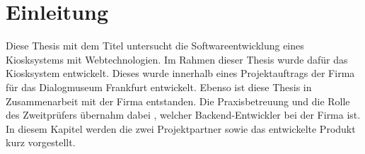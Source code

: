 \chapter{Einleitung}
\label{chap:einleitung}

Diese Thesis mit dem Titel \emph{\getTitle{}} untersucht die Softwareentwicklung eines 
Kiosksystems mit Webtechnologien. Im Rahmen dieser Thesis wurde dafür das Kiosksystem
\emph{\shst{}} entwickelt. Dieses wurde innerhalb eines Projektauftrags der Firma 
\mesoFull{} für das Dialogmuseum Frankfurt entwickelt. Ebenso ist diese Thesis in
Zusammenarbeit mit der Firma \meso{} entstanden. Die Praxisbetreuung und die Rolle
des Zweitprüfers übernahm dabei \getAdvisor{}, welcher Backend-Entwickler
bei der Firma \meso{} ist.\\

In diesem Kapitel werden die zwei Projektpartner sowie das entwickelte Produkt kurz
vorgestellt.



